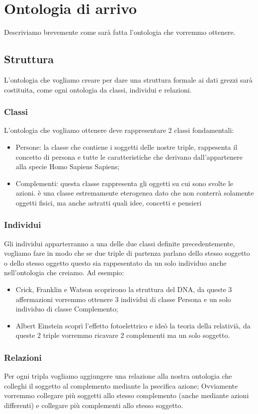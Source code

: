 \section{Ontologia di arrivo}
	Descriviamo brevemente come sarà fatta l'ontologia che vorremmo ottenere.
	\subsection{Struttura}
		L'ontologia che vogliamo creare per dare una struttura formale ai dati grezzi sarà costituita, come ogni ontologia da classi, individui e relazioni.
		\subsubsection{Classi}
			L'ontologia che vogliamo ottenere deve rappresentare 2 classi fondamentali:
			\begin{itemize}
				\item Persone: la classe che contiene i soggetti delle nostre triple, rappesenta il concetto di persona e tutte le caratteristiche che derivano dall'appartenere alla specie Homo Sapiens Sapiens;
				\item Complementi: questa classe rappresenta gli oggetti su cui sono svolte le azioni. è una classe estremamente eterogenea dato che non conterrà solamente oggetti fisici, ma anche astratti quali idee, concetti e pensieri
			\end{itemize}
		\subsubsection{Individui}
			Gli individui apparterranno a una delle due classi definite precedentemente, vogliamo fare in modo che se due triple di partenza parlano dello stesso soggetto o dello stesso oggetto questo sia rappesentato da un solo individuo anche nell'ontologia che creiamo. Ad esempio:
			\begin{itemize}
				\item Crick, Franklin e Watson scoprirono la struttura del DNA, da queste 3 affermazioni vorremmo ottenere 3 individui di classe Persona e un solo individuo di classe Complemento;
				\item Albert Einstein scoprì l'effetto fotoelettrico e ideò la teoria della relativià, da queste 2 triple vorremmo ricavare 2 complementi ma un solo soggetto.
			\end{itemize}
		\subsubsection{Relazioni}
			Per ogni tripla vogliamo aggiungere una relazione alla nostra ontologia che colleghi il soggetto al complemento mediante la psecifica azione; Ovviamente vorremmo collegare più soggetti allo stesso complemento (anche mediante azioni differenti) e collegare più complementi allo stesso soggetto.
